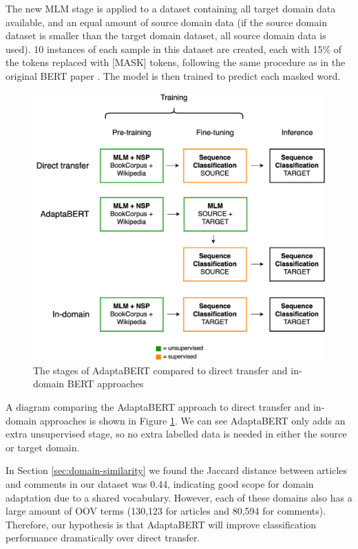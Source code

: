 The new MLM stage is applied to a dataset containing all target domain data available, and an equal amount of source domain data (if the source domain dataset is smaller than the target domain dataset, all source domain data is used). 10 instances of each sample in this dataset are created, each with 15\% of the tokens replaced with [MASK] tokens, following the same procedure as in the original BERT paper \cite{bert}. The model is then trained to predict each masked word.

\begin{figure}[ht]
    \centering
    \hspace{-1.5cm}
    \includegraphics[scale=0.29]{0-img/adaptabert.png}
    \caption{The stages of AdaptaBERT compared to direct transfer and in-domain BERT approaches}
    \label{fig:adaptabert}
\end{figure}

A diagram comparing the AdaptaBERT approach to direct transfer and in-domain approaches is shown in Figure \ref{fig:adaptabert}. We can see AdaptaBERT only adds an extra unsupervised stage, so no extra labelled data is needed in either the source or target domain.

In Section \ref{sec:domain-similarity} we found the Jaccard distance between articles and comments in our dataset was 0.44, indicating good scope for domain adaptation due to a shared vocabulary. However, each of these domains also has a large amount of OOV terms (130,123 for articles and 80,594 for comments). Therefore, our hypothesis is that AdaptaBERT will improve classification performance dramatically over direct transfer.

